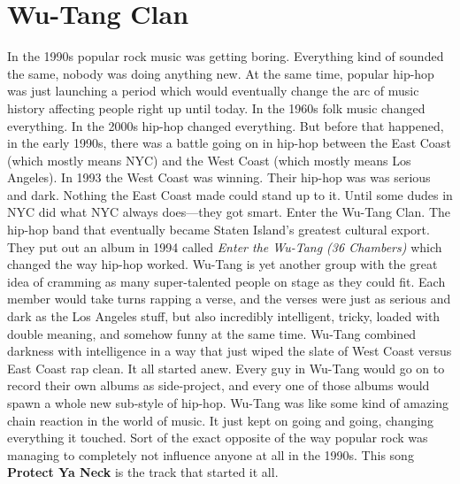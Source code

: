 \documentclass[letterpaper,single]{article}
\begin{document}
\section{Wu-Tang Clan}
In the 1990s popular rock music was getting boring. Everything kind
of sounded the same, nobody was doing anything new. At the same time,
popular hip-hop was just launching a period which would eventually
change the arc of music history affecting people right up until today.
In the 1960s folk music changed everything. In the 2000s hip-hop changed
everything. But before that happened, in the early 1990s, there was a
battle going on in hip-hop between the East Coast (which mostly means
NYC) and the West Coast (which mostly means Los Angeles). In 1993 the
West Coast was winning. Their hip-hop was was serious and dark. Nothing
the East Coast made could stand up to it. Until some dudes in NYC did
what NYC always does---they got smart. Enter the Wu-Tang Clan. The
hip-hop band that eventually became Staten Island's greatest cultural
export. They put out an album in 1994 called \emph{Enter the Wu-Tang (36
Chambers)} which changed the way hip-hop worked. Wu-Tang is yet another
group with the great idea of cramming as many super-talented people on
stage as they could fit. Each member would take turns rapping a verse,
and the verses were just as serious and dark as the Los Angeles stuff,
but also incredibly intelligent, tricky, loaded with double meaning,
and somehow funny at the same time. Wu-Tang combined darkness with
intelligence in a way that just wiped the slate of West Coast versus
East Coast rap clean. It all started anew. Every guy in Wu-Tang would
go on to record their own albums as side-project, and every one of
those albums would spawn a whole new sub-style of hip-hop. Wu-Tang was
like some kind of amazing chain reaction in the world of music. It just
kept on going and going, changing everything it touched. Sort of the
exact opposite of the way popular rock was managing to completely not
influence anyone at all in the 1990s. This song \textbf{Protect Ya Neck}
is the track that started it all.
\end{document}
